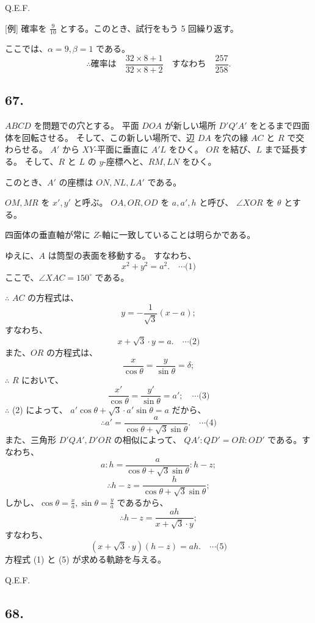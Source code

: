 Q.E.F.

[例]
確率を $\frac{9}{10}$ とする。このとき、試行をもう 5 回繰り返す。

ここでは、$\alpha = 9, \beta = 1$ である。
\[
\therefore
\mbox{確率は}
\quad
\frac{32 \times 8 + 1}{32 \times 8 + 2}
\quad
\mbox{すなわち}
\quad
\frac{257}{258}.
\]

\subsection*{67.}

$ABCD$ を問題での穴とする。
平面 $DOA$ が新しい場所 $D'Q'A'$ をとるまで四面体を回転させる。
そして、この新しい場所で、辺 $DA$ を穴の縁 $AC$ と $R$
で交わらせる。
$A'$ から $XY$-平面に垂直に $A'L$ をひく。
$OR$ を結び、$L$ まで延長する。
そして、$R$ と $L$ の $y$-座標へと、$RM, LN$ をひく。

このとき、$A'$ の座標は $ON, NL, LA'$ である。

$OM, MR$ を $x', y'$ と呼ぶ。
$OA, OR, OD$ を $a, a', h$ と呼び、
$\angle XOR$ を $\theta$ とする。

四面体の垂直軸が常に $Z$-軸に一致していることは明らかである。

ゆえに、$A$ は筒型の表面を移動する。
すなわち、
\[
x^2 + y^2 = a^2.
\quad \cdots \mbox{(1)}
\]
ここで、$\angle XAC = 150^\circ$ である。

$\therefore$ $AC$ の方程式は、
\[
y = - \frac{1}{\sqrt{3}} (x - a);
\]
すなわち、
\[
x + \sqrt{3} \cdot y = a.
\quad \cdots \mbox{(2)}
\]
また、$OR$ の方程式は、
\[
\frac{x}{\cos \theta} = \frac{y}{\sin \theta} = \delta;
\]
$\therefore$ $R$ において、
\[
\frac{x'}{\cos \theta} = \frac{y'}{\sin \theta} = a';
\quad \cdots \mbox{(3)}
\]
$\therefore$ (2) によって、
$a' \cos \theta + \sqrt{3} \cdot a' \sin \theta = a$
だから、
\[
\therefore
a' = \frac{a}{\cos \theta + \sqrt{3} \sin \theta}.
\quad \cdots \mbox{(4)}
\]
また、三角形 $D'QA', D'OR$ の相似によって、
$QA' : QD' = OR: OD'$ である。すなわち、
\[
a : h = \frac{a}{\cos \theta + \sqrt{3} \sin \theta} : h - z;
\]
\[
\therefore
h - z = \frac{h}{\cos \theta + \sqrt{3} \sin \theta};
\]
しかし、$\cos \theta = \frac{x}{a}, \sin \theta = \frac{y}{a}$
であるから、
\[
\therefore
h - z = \frac{ah}{x + \sqrt{3} \cdot y};
\]
すなわち、
\[
(x + \sqrt{3} \cdot y )(h - z) = ah.
\quad \cdots \mbox{(5)}
\]
方程式 (1) と (5) が求める軌跡を与える。

Q.E.F.


\subsection*{68.}

